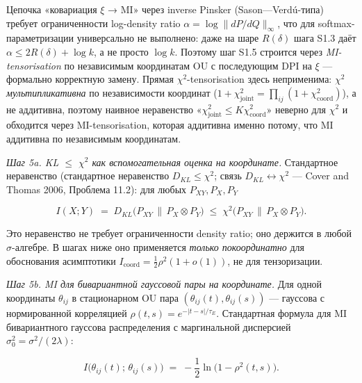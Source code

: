 \documentclass[pdflatex,sn-mathphys-ay]{sn-jnl}
\begin{document}
Цепочка «ковариация \(\xi\) → MI» через inverse Pinsker (Sason---Verdú-типа) требует ограниченности log-density ratio \(\alpha = \log\|dP/dQ\|_\infty\), что для softmax-параметризации универсально не выполнено: даже на шаре \(R(\delta)\) шага S1.3 даёт \(\alpha \le 2R(\delta) + \log k\), а не просто \(\log k\). Поэтому шаг S1.5 строится через \emph{MI-tensorisation} по независимым координатам OU с последующим DPI на \(\xi\) --- формально корректную замену. Прямая \(\chi^2\)-tensorisation здесь неприменима: \(\chi^2\) \emph{мультипликативна} по независимости координат (\(1 + \chi^2_{\text{joint}} = \prod_{ij}(1 + \chi^2_{\text{coord}})\)), а не аддитивна, поэтому наивное неравенство «\(\chi^2_{\text{joint}} \le K \chi^2_{\text{coord}}\)» неверно для \(\chi^2\) и обходится через MI-tensorisation, которая аддитивна именно потому, что MI аддитивна по независимым координатам.



\emph{Шаг 5a. KL \(\le\) \(\chi^2\) как вспомогательная оценка на координате.} Стандартное неравенство (стандартное неравенство \(D_{KL} \le \chi^2\); связь \(D_{KL}\leftrightarrow\chi^2\) --- Cover and Thomas 2006, Проблема 11.2): для любых \(P_{XY}, P_X, P_Y\)



\[I(X; Y) \;=\; D_{KL}\bigl(P_{XY} \,\|\, P_X \otimes P_Y\bigr) \;\le\; \chi^2\bigl(P_{XY} \,\|\, P_X \otimes P_Y\bigr).\]



Это неравенство не требует ограниченности density ratio; оно держится в любой \(\sigma\)-алгебре. В шагах ниже оно применяется \emph{только покоординатно} для обоснования асимптотики \(I_{\text{coord}} = \tfrac{1}{2}\rho^2(1 + o(1))\), не для тензоризации.



\emph{Шаг 5b. MI для бивариантной гауссовой пары на координате.} Для одной координаты \(\theta_{ij}\) в стационарном OU пара \((\theta_{ij}(t), \theta_{ij}(s))\) --- гауссова с нормированной корреляцией \(\rho(t,s) = e^{-|t-s|/\tau_E}\). Стандартная формула для MI бивариантного гауссова распределения с маргинальной дисперсией \(\sigma_0^2 = \sigma^2/(2\lambda)\):



\begin{equation}I\bigl(\theta_{ij}(t);\, \theta_{ij}(s)\bigr) \;=\; -\frac{1}{2}\ln\bigl(1 - \rho^2(t,s)\bigr). \tag{S1.5a}\end{equation}
\end{document}
